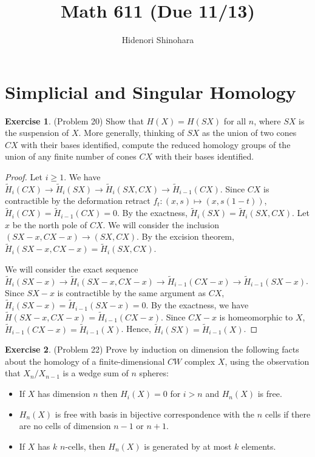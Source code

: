 \documentclass[12pt, psamsfonts]{amsart}
\theoremstyle{definition}
\newtheorem*{exer}{Exercise}
\theoremstyle{remark}
\numberwithin{equation}{section}
\begin{document}
\title{Math 611 (Due 11/13)}
\author{Hidenori Shinohara}
\maketitle

\section{Simplicial and Singular Homology}

\begin{exer}{(Problem 20)}
  Show that $H(X) = H(SX)$ for all $n$, where $SX$ is the suspension of $X$.
  More generally, thinking of $SX$ as the union of two cones $CX$ with their bases identified, compute the reduced homology groups of the union of any finite number of cones $CX$ with their bases identiﬁed.
\end{exer}

\begin{proof}
  Let $i \geq 1$.
  We have $\tilde{H}_i(CX) \rightarrow \tilde{H}_i(SX) \rightarrow \tilde{H}_i(SX, CX) \rightarrow \tilde{H}_{i - 1}(CX)$.
  Since $CX$ is contractible by the deformation retract $f_t: (x, s) \mapsto (x, s(1 - t))$, $\tilde{H}_i(CX) = \tilde{H}_{i - 1}(CX) = 0$.
  By the exactness, $\tilde{H}_i(SX) = \tilde{H}_i(SX, CX)$.
  Let $x$ be the north pole of $CX$.
  We will consider the inclusion $(SX - x, CX - x) \rightarrow (SX, CX)$.
  By the excision theorem, $\tilde{H}_i(SX - x, CX - x) = \tilde{H}_i(SX, CX)$.

  We will consider the exact sequence $\tilde{H}_i(SX - x) \rightarrow \tilde{H}_i(SX - x, CX - x) \rightarrow \tilde{H}_{i - 1}(CX - x) \rightarrow \tilde{H}_{i - 1}(SX - x)$.
  Since $SX - x$ is contractible by the same argument as $CX$, $\tilde{H}_i(SX - x) = \tilde{H}_{i - 1}(SX - x) = 0$.
  By the exactness, we have $\tilde{H}(SX - x, CX - x) = \tilde{H}_{i - 1}(CX - x)$.
  Since $CX - x$ is homeomorphic to $X$, $\tilde{H}_{i - 1}(CX - x) = \tilde{H}_{i - 1}(X)$.
  Hence, $\tilde{H}_i(SX) = \tilde{H}_{i - 1}(X)$.

\end{proof}

\begin{exer}{(Problem 22)}
  Prove by induction on dimension the following facts about the homology of a finite-dimensional $CW$ complex $X$, using the observation that $X_n / X_{n−1}$ is a wedge sum of $n$ spheres:
  \begin{itemize}
    \item
      If $X$ has dimension $n$ then $H_i(X) = 0$ for $i > n$ and $H_n(X)$ is free.
    \item
      $H_n(X)$ is free with basis in bijective correspondence with the $n$ cells if there are no cells of dimension $n - 1$ or $n + 1$.
    \item
      If $X$ has $k$ $n$-cells, then $H_n(X)$ is generated by at most $k$ elements.
  \end{itemize}
\end{exer}
\end{document}
